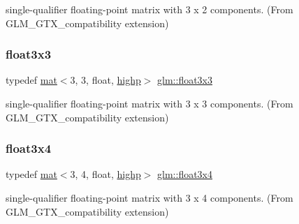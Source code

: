 single-\/qualifier floating-\/point matrix with 3 x 2 components. (From G\+L\+M\+\_\+\+G\+T\+X\+\_\+compatibility extension) 

\mbox{\label{group__gtx__compatibility_ga0c6bbdaa1ebe76fbb55a77d5ca0e2846}} 
\subsubsection{\texorpdfstring{float3x3}{float3x3}}
{\footnotesize\ttfamily typedef \hyperlink{structglm_1_1mat}{mat}$<$3, 3, float, \hyperlink{namespaceglm_a36ed105b07c7746804d7fdc7cc90ff25ac6f7eab42eacbb10d59a58e95e362074}{highp}$>$ \hyperlink{group__gtx__compatibility_ga0c6bbdaa1ebe76fbb55a77d5ca0e2846}{glm\+::float3x3}}



single-\/qualifier floating-\/point matrix with 3 x 3 components. (From G\+L\+M\+\_\+\+G\+T\+X\+\_\+compatibility extension) 

\mbox{\label{group__gtx__compatibility_ga53ae5a5af5943b6557eda4a6502e4484}} 
\subsubsection{\texorpdfstring{float3x4}{float3x4}}
{\footnotesize\ttfamily typedef \hyperlink{structglm_1_1mat}{mat}$<$3, 4, float, \hyperlink{namespaceglm_a36ed105b07c7746804d7fdc7cc90ff25ac6f7eab42eacbb10d59a58e95e362074}{highp}$>$ \hyperlink{group__gtx__compatibility_ga53ae5a5af5943b6557eda4a6502e4484}{glm\+::float3x4}}



single-\/qualifier floating-\/point matrix with 3 x 4 components. (From G\+L\+M\+\_\+\+G\+T\+X\+\_\+compatibility extension) 

\mbox{\label{group__gtx__compatibility_ga5b28e8af9bfee363940882dd7d1214b5}} 
